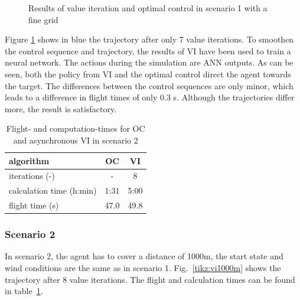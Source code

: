 \begin{figure}[hbt]
	\caption{Results of value iteration and optimal control in scenario 1 with a fine grid}
	\label{tikz:vi500m}
\end{figure}

Figure \ref{tikz:vi500m} shows in blue the trajectory after only 7 value iterations. To smoothen the control sequence and trajectory, the results of VI have been used to train a neural network. The actions during the simulation are ANN outputs. As can be seen, both the policy from VI and the optimal control direct the agent towards the target. The differences between the control sequences are only minor, which leads to a difference in flight times of only 0.3 s. Although the trajectories differ more, the result is satisfactory.

\begin{table}[htb]
	\begin{center}
		\begin{tabular}{l|c c}
			algorithm & OC & VI \\ \hline 
			iterations (-) & - & 8 \\
			calculation time (h:min) & 1:31 & 5:00 \\
			flight time (s) & 47.0 & 49.8
		\end{tabular}
		\caption{Flight- and computation-times for OC and asynchronous VI in scenario 2}
		\label{tab:2d_flight_data_1000m}
	\end{center}
\end{table}
\FloatBarrier

\subsubsection{Scenario 2}

In scenario 2, the agent has to cover a distance of 1000m, the start state and wind conditions are the same as in scenario 1. Fig.~\ref{tikz:vi1000m} shows the trajectory after 8 value iterations. The flight and calculation times can be found in table~\ref{tab:2d_flight_data_1000m}.

